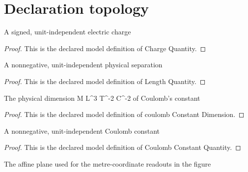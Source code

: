 \section{Declaration topology}
\begin{definition}
  \label{def:physics:phyx-mini-0855:phyxminiproblems-problemphyxmini0855-chargequantity}
  A signed, unit-independent electric charge
\end{definition}
\begin{proof}
  This is the declared model definition of Charge Quantity.
\end{proof}
\begin{definition}
  \label{def:physics:phyx-mini-0855:phyxminiproblems-problemphyxmini0855-lengthquantity}
  A nonnegative, unit-independent physical separation
\end{definition}
\begin{proof}
  This is the declared model definition of Length Quantity.
\end{proof}
\begin{definition}
  \label{def:physics:phyx-mini-0855:phyxminiproblems-problemphyxmini0855-coulombconstantdimension}
  The physical dimension M L\textasciicircum{}3 T\textasciicircum{}-2 C\textasciicircum{}-2 of Coulomb's constant
\end{definition}
\begin{proof}
  This is the declared model definition of coulomb Constant Dimension.
\end{proof}
\begin{definition}
  \label{def:physics:phyx-mini-0855:phyxminiproblems-problemphyxmini0855-coulombconstantquantity}
  A nonnegative, unit-independent Coulomb constant
\end{definition}
\begin{proof}
  This is the declared model definition of Coulomb Constant Quantity.
\end{proof}
\begin{definition}
  \label{def:physics:phyx-mini-0855:phyxminiproblems-problemphyxmini0855-figureplane}
  The affine plane used for the metre-coordinate readouts in the figure
\end{definition}
